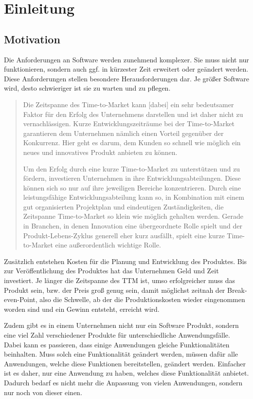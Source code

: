 \chapter{Einleitung}
\label{chap:einleitung}

\section{Motivation}
\label{sec:motivation}
Die Anforderungen an Software werden zunehmend komplexer. Sie muss nicht nur funktionieren, sondern auch ggf. in kürzester Zeit erweitert oder geändert werden. Diese Anforderungen stellen besondere Herausforderungen dar. Je größer Software wird, desto schwieriger ist sie zu warten und zu pflegen. 

\begin{quotation}
\frqq Die Zeitspanne des Time-to-Market kann [dabei] ein sehr bedeutsamer Faktor für den Erfolg des Unternehmens darstellen und ist daher nicht zu vernachlässigen. Kurze Entwicklungszeiträume bei der Time-to-Market garantieren dem Unternehmen nämlich einen Vorteil gegenüber der Konkurrenz. Hier geht es darum, dem Kunden so schnell wie möglich ein neues und innovatives Produkt anbieten zu können.
    
Um den Erfolg durch eine kurze Time-to-Market zu unterstützen und zu fördern, investieren Unternehmen in ihre Entwicklungsabteilungen. Diese können sich so nur auf ihre jeweiligen Bereiche konzentrieren. Durch eine leistungsfähige Entwicklungsabteilung kann so, in Kombination mit einem gut organisierten Projektplan und eindeutigen Zuständigkeiten, die Zeitspanne Time-to-Market so klein wie möglich gehalten werden. Gerade in Branchen, in denen Innovation eine übergeordnete Rolle spielt und der Produkt-Lebens-Zyklus generell eher kurz ausfällt, spielt eine kurze Time-to-Market eine außerordentlich wichtige Rolle.\flqq \cite{ttm}
\end{quotation}

Zusätzlich entstehen Kosten für die Planung und Entwicklung des Produktes. Bis zur Veröffentlichung des Produktes hat das Unternehmen Geld und Zeit investiert. Je länger die Zeitspanne des TTM ist, umso erfolgreicher muss das Produkt sein, bzw. der Preis groß genug sein, damit möglichst zeitnah der Break-even-Point, also die Schwelle, ab der die Produktionskosten wieder eingenommen worden sind und ein Gewinn entsteht, erreicht wird.

Zudem gibt es in einem Unternehmen nicht nur ein Software Produkt, sondern eine viel Zahl verschiedener Produkte für unterschiedliche Anwendungsfälle. Dabei kann es passieren, dass einige Anwendungen gleiche Funktionalitäten beinhalten. Muss solch eine Funktionalität geändert werden, müssen dafür alle Anwendungen, welche diese Funktionen bereitstellen, geändert werden. Einfacher ist es daher, nur eine Anwendung zu haben, welches diese Funktionalität anbietet. Dadurch bedarf es nicht mehr die Anpassung von vielen Anwendungen, sondern nur noch von dieser einen.

